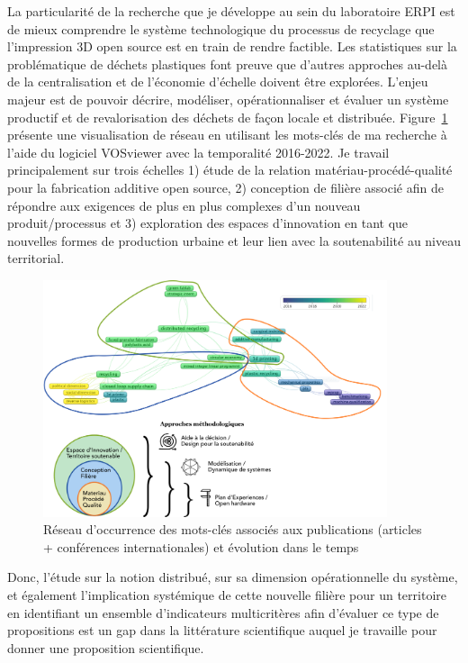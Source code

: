 \documentclass[
  11pt,
]{article}
\begin{document}
La particularité de la recherche que je développe au sein du laboratoire
ERPI est de mieux comprendre le système technologique du processus de
recyclage que l'impression 3D open source est en train de rendre
factible. Les statistiques sur la problématique de déchets plastiques
font preuve que d'autres approches au-delà de la centralisation et de
l'économie d'échelle doivent être explorées. L'enjeu majeur est de
pouvoir décrire, modéliser, opérationnaliser et évaluer un système
productif et de revalorisation des déchets de façon locale et
distribuée. Figure~\ref{fig-vosviewer} présente une visualisation de
réseau en utilisant les mots-clés de ma recherche à l'aide du logiciel
VOSviewer avec la temporalité 2016-2022. Je travail principalement sur
trois échelles 1) étude de la relation matériau-procédé-qualité pour la
fabrication additive open source, 2) conception de filière associé afin
de répondre aux exigences de plus en plus complexes d'un nouveau
produit/processus et 3) exploration des espaces d'innovation en tant que
nouvelles formes de production urbaine et leur lien avec la
soutenabilité au niveau territorial.

\begin{figure}[H]

{\centering \includegraphics[width=0.9\textwidth,height=\textheight]{Figures/Vosviewer.png}

}

\caption{\label{fig-vosviewer}Réseau d'occurrence des mots-clés associés
aux publications (articles + conférences internationales) et évolution
dans le temps}

\end{figure}

Donc, l'étude sur la notion distribué, sur sa dimension opérationnelle
du système, et également l'implication systémique de cette nouvelle
filière pour un territoire en identifiant un ensemble d'indicateurs
multicritères afin d'évaluer ce type de propositions est un gap dans la
littérature scientifique auquel je travaille pour donner une proposition
scientifique.
\end{document}

